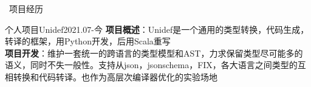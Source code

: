 \documentclass[UTF8]{resume}
\begin{document}
\begin{rSection}{\faUsers~项目经历}


    \begin{rProject}{个人项目}{Unidef}{2021.07-今}
        \textbf{项目概述}：Unidef是一个通用的类型转换，代码生成，转译的框架，用Python开发，后用Scala重写\\
        \textbf{项目开发}：维护一套统一的跨语言的类型模型和AST，力求保留类型尽可能多的语义，同时不失一般性。支持从json，jsonschema，FIX，各大语言之间类型的互相转换和代码转译。也作为高层次编译器优化的实验场地
    \end{rProject}
    


\end{rSection}
\end{document}
